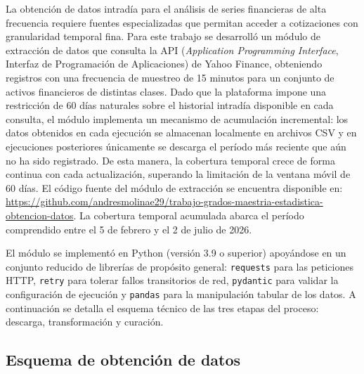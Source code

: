\documentclass[12pt]{paper}
\begin{document}
La obtención de datos intradía para el análisis de series financieras de alta frecuencia requiere fuentes especializadas que permitan acceder a cotizaciones con granularidad temporal fina. Para este trabajo se desarrolló un módulo de extracción de datos que consulta la API (\textit{Application Programming Interface}, Interfaz de Programación de Aplicaciones) de Yahoo Finance, obteniendo registros con una frecuencia de muestreo de 15 minutos para un conjunto de activos financieros de distintas clases. Dado que la plataforma impone una restricción de 60 días naturales sobre el historial intradía disponible en cada consulta, el módulo implementa un mecanismo de acumulación incremental: los datos obtenidos en cada ejecución se almacenan localmente en archivos CSV y en ejecuciones posteriores únicamente se descarga el período más reciente que aún no ha sido registrado. De esta manera, la cobertura temporal crece de forma continua con cada actualización, superando la limitación de la ventana móvil de 60 días. El código fuente del módulo de extracción se encuentra disponible en: \url{https://github.com/andresmolinae29/trabajo-grados-maestria-estadistica-obtencion-datos}. La cobertura temporal acumulada abarca el período comprendido entre el 5 de febrero y el 2 de julio de 2026.

El módulo se implementó en Python (versión 3.9 o superior) apoyándose en un conjunto reducido de librerías de propósito general: \texttt{requests} para las peticiones HTTP, \texttt{retry} para tolerar fallos transitorios de red, \texttt{pydantic} para validar la configuración de ejecución y \texttt{pandas} para la manipulación tabular de los datos. A continuación se detalla el esquema técnico de las tres etapas del proceso: descarga, transformación y curación.

\subsection{Esquema de obtención de datos}
\end{document}
